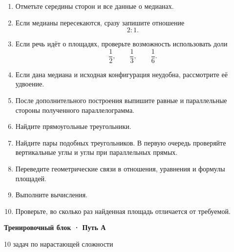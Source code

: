 \documentclass[a4paper,12pt]{article}
\begin{document}
\begin{enumerate}

  \item
  Отметьте середины сторон и все данные о медианах.

  \item
  Если медианы пересекаются, сразу запишите отношение
  \[
  2:1.
  \]

  \item
  Если речь идёт о площадях, проверьте возможность
  использовать доли
  \[
  \frac12,\qquad
  \frac13,\qquad
  \frac16.
  \]

  \item
  Если дана медиана и исходная конфигурация неудобна,
  рассмотрите её удвоение.

  \item
  После дополнительного построения выпишите равные и
  параллельные стороны полученного параллелограмма.

  \item
  Найдите прямоугольные треугольники.

  \item
  Найдите пары подобных треугольников.
  В первую очередь проверяйте вертикальные углы и углы
  при параллельных прямых.

  \item
  Переведите геометрические связи в отношения,
  уравнения и формулы площадей.

  \item
  Выполните вычисления.

  \item
  Проверьте, во сколько раз найденная площадь отличается
  от требуемой.

\end{enumerate}


\newpage

\thispagestyle{fancy}

\begin{center}
{\LARGE\bfseries\color{darkaccent}
Тренировочный блок · Путь А\par}

\vspace{2mm}

{\color{softgray}
10 задач по нарастающей сложности\par}
\end{center}
\end{document}
